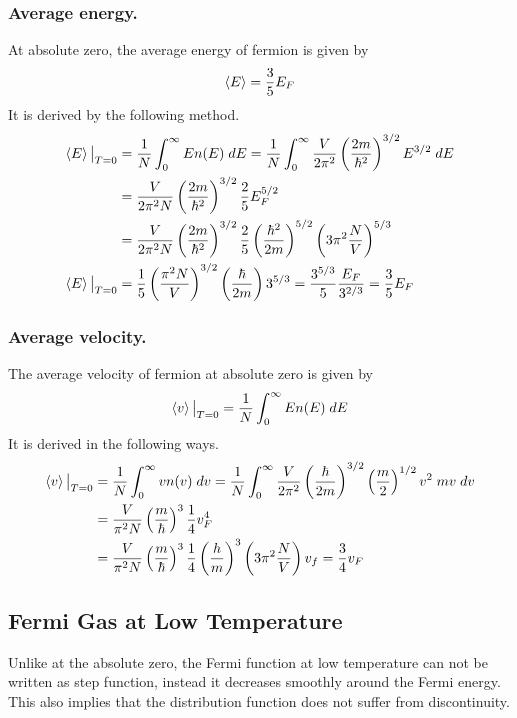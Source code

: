 \documentclass[../../../Main.tex]{subfiles}
\begin{document}
\subsubsection{Average energy.} At absolute zero, the average energy of fermion is given by 
\begin{equation*}
    \braket{E}=\frac{3}{5}E_F
\end{equation*}
It is derived by the following method.
\begin{align*}
    \braket{E}\big|_{T=0}&= \frac{1}{N}\int_{0}^{\infty}En(E)\;dE =\frac{1}{N}\int_{0}^{\infty} \frac{V}{2\pi^2}\left(\frac{2m}{\hbar^2}\right)^{3/2}E^{3/2}\;dE\\
    &=\frac{V}{2\pi^2 N}\left(\frac{2m}{\hbar^2}\right)^{3/2}\frac{2}{5}E_F^{5/2}\\
    &=\frac{V}{2\pi^2 N}\left(\frac{2m}{\hbar^2}\right)^{3/2}\frac{2}{5}\left(\frac{\hbar^2}{2m}\right)^{5/2}\left(3\pi^2\frac{N}{V}\right)^{5/3}\\
    \braket{E}\big|_{T=0}&=\frac{1}{5}\left(\frac{\pi^2N}{V}\right)^{3/2}\left(\frac{\hbar}{2m}\right)3^{5/3}=\frac{3^{5/3}}{5}\frac{E_F}{3^{2/3}}=\frac{3}{5}E_F
\end{align*}

\subsubsection{Average velocity.} The average velocity of fermion at absolute zero is given by 
\begin{equation*}
    \braket{v}\big|_{T=0}= \frac{1}{N}\int_{0}^{\infty}En(E)\;dE 
\end{equation*}
It is derived in the following ways.
\begin{align*}
    \braket{v}\big|_{T=0}&=\frac{1}{N}\int_{0}^{\infty}vn(v)\;dv=\frac{1}{N}\int_{0}^{\infty} \frac{V}{2\pi^2}\left(\frac{\hbar}{2m}\right)^{3/2}\left(\frac{m}{2}\right)^{1/2}v^2\;mv\;dv\\
    &=\frac{V}{\pi^2N}\left(\frac{m}{\hbar}\right)^3\frac{1}{4}v_F^4\\
    &=\frac{V}{\pi^2N}\left(\frac{m}{\hbar}\right)^3\frac{1}{4} \left(\frac{h}{m}\right)^3\left(3\pi^2\frac{N}{V}\right)v_f=\frac{3}{4}v_F
\end{align*}

\subsection{Fermi Gas at Low Temperature}
Unlike at the absolute zero, the Fermi function at low temperature can not be written as step function, instead it decreases smoothly around the Fermi energy. This also implies that the distribution function does not suffer from discontinuity.
\end{document}
